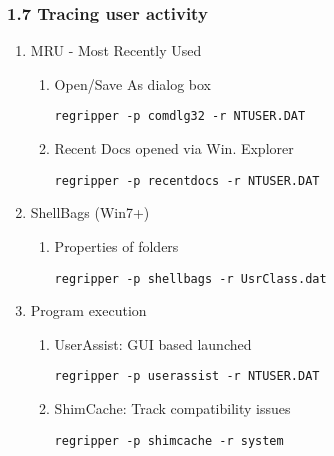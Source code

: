 \begin{frame}[fragile]
  \frametitle{1.7 Tracing user activity}
  \begin{enumerate}
	  \item[] MRU - Most Recently Used
      \begin{enumerate}
	      \item[] Open/Save As dialog box
              \begin{lstlisting}[basicstyle=\tiny]
  regripper -p comdlg32 -r NTUSER.DAT
              \end{lstlisting}
	      \item[] Recent Docs opened via Win. Explorer
		      \begin{lstlisting}[basicstyle=\tiny]
  regripper -p recentdocs -r NTUSER.DAT
              \end{lstlisting}
      \end{enumerate}
	  \item[] ShellBags (Win7+)
      \begin{enumerate}
	      \item[] Properties of folders
              \begin{lstlisting}[basicstyle=\tiny]
  regripper -p shellbags -r UsrClass.dat
              \end{lstlisting}
      \end{enumerate}
	  \item[] Program execution
      \begin{enumerate}
	      \item[] UserAssist: GUI based launched
              \begin{lstlisting}[basicstyle=\tiny]
  regripper -p userassist -r NTUSER.DAT
              \end{lstlisting}
	      \item[] ShimCache: Track compatibility issues
              \begin{lstlisting}[basicstyle=\tiny]
  regripper -p shimcache -r system
              \end{lstlisting}
      \end{enumerate}
  \end{enumerate}
\end{frame}


